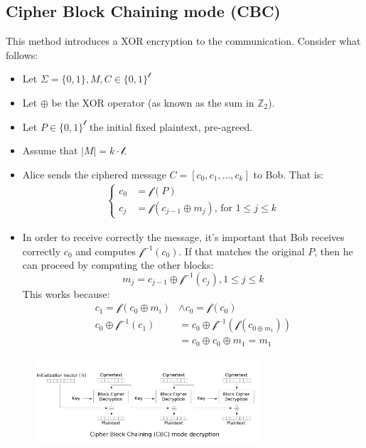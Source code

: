 \subsection{Cipher Block Chaining mode (CBC)}
This method introduces a XOR encryption to the communication. \newline
Consider what follows:
\begin{itemize}
    \item Let $\Sigma = \{0,1\}, M, C \in \{0,1\}^{\mathcal{l}}$
    \item Let $\oplus$ be the XOR operator (as known as the sum in $\mathbb{Z}_{2}$).
    \item Let $P \in \{0,1\}^{\mathcal{l}}$ the initial fixed plaintext, pre-agreed.
    \item Assume that $|M| = k \cdot \mathcal{l}$.
    \item Alice sends the ciphered message $C = [c_{0}, c_{1}, \dots, c_{k}]$ to Bob. That is:
    \begin{align*}
        \begin{cases}
          c_{0} & = \mathcal{f}(P)\\
          c_{j} & = \mathcal{f}(c_{j-1} \oplus m_{j}) \text{, for } 1 \leq j \leq k
        \end{cases}
    \end{align*}
    \item In order to receive correctly the message, it's important that Bob receives correctly $c_{0}$ and computes $\mathcal{f}^{-1}(c_{0})$. If that matches the original $P$, then he can proceed by computing the other blocks:
    \[m_{j} = c_{j-1} \oplus \mathcal{f}^{-1}(c_{j}), 1 \leq j \leq k\]
    This works because:
    \begin{align*}
        c_{1} = \mathcal{f}(c_{0} \oplus m_{i}) & \land c_{0} = \mathcal{f}(c_{0}) \\
        c_{0} \oplus \mathcal{f}^{-1}(c_{1}) & = c_{0} \oplus \mathcal{f}^{-1}(\mathcal{f}(c_{0 \oplus m_{1}})) \\
        & = c_{0} \oplus c_{0} \oplus m_{1} = m_{1}
    \end{align*}
\end{itemize}

\begin{figure}[h]
    \centering
    \includegraphics[width=0.75\textwidth]{img/CBC.png}
\end{figure}


